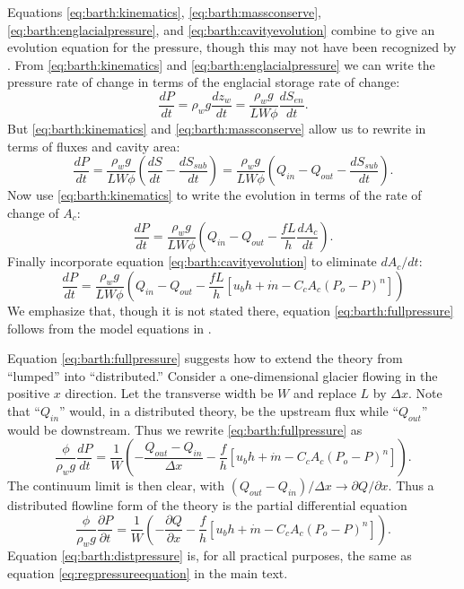 \documentclass[11pt,final]{amsart}
\begin{document}
Equations \eqref{eq:barth:kinematics}, \eqref{eq:barth:massconserve}, \eqref{eq:barth:englacialpressure}, and \eqref{eq:barth:cavityevolution} combine to give an evolution equation for the pressure, though this may not have been recognized by \cite{Bartholomausetal2011}.  From \eqref{eq:barth:kinematics} and \eqref{eq:barth:englacialpressure} we can write the pressure rate of change in terms of the englacial storage rate of change:
	$$\frac{dP}{dt} = \rho_w g \frac{dz_w}{dt} = \frac{\rho_w g}{L W \phi} \frac{d S_{en}}{dt}.$$
But \eqref{eq:barth:kinematics} and \eqref{eq:barth:massconserve}  allow us to rewrite in terms of fluxes and cavity area:
    $$\frac{dP}{dt} = \frac{\rho_w g}{L W \phi} \left(\frac{d S}{dt} - \frac{d S_{sub}}{dt}\right) = \frac{\rho_w g}{L W \phi} \left(Q_{in} - Q_{out} - \frac{d S_{sub}}{dt}\right).$$
Now use \eqref{eq:barth:kinematics} to write the evolution in terms of the rate of change of $A_c$:
    $$\frac{dP}{dt} = \frac{\rho_w g}{L W \phi} \left(Q_{in} - Q_{out} - \frac{f L }{h} \frac{d A_c}{dt}\right).$$
Finally incorporate equation \eqref{eq:barth:cavityevolution} to eliminate $dA_c/dt$:
\begin{equation}
\frac{dP}{dt} = \frac{\rho_w g}{L W \phi} \left(Q_{in} - Q_{out} - \frac{f L }{h} \left[u_b h + \dot m - C_c A_c (P_o-P)^n\right]\right)  \label{eq:barth:fullpressure}
\end{equation}
We emphasize that, though it is not stated there, equation \eqref{eq:barth:fullpressure} follows from the model equations in \cite{Bartholomausetal2011}.

Equation \eqref{eq:barth:fullpressure} suggests how to extend the \cite{Bartholomausetal2011} theory from ``lumped'' into ``distributed.''  Consider a one-dimensional glacier flowing in the positive $x$ direction.  Let the transverse width be $W$ and replace $L$ by $\Delta x$.  Note that ``$Q_{in}$'' would, in a distributed theory, be the upstream flux while ``$Q_{out}$'' would be downstream.  Thus we rewrite \eqref{eq:barth:fullpressure} as
\begin{equation*}
\frac{\phi}{\rho_w g}\frac{dP}{dt} = \frac{1}{W} \left(- \frac{Q_{out} - Q_{in}}{\Delta x} - \frac{f}{h} \left[u_b h + \dot m - C_c A_c (P_o-P)^n\right]\right).
\end{equation*}
The continuum limit is then clear, with $(Q_{out} - Q_{in})/\Delta x \to \partial Q/\partial x$.  Thus a distributed flowline form of the \cite{Bartholomausetal2011} theory is the partial differential equation
\begin{equation}
\frac{\phi}{\rho_w g} \frac{\partial P}{\partial t} = \frac{1}{W} \left(- \frac{\partial Q}{\partial x} - \frac{f}{h} \left[u_b h + \dot m - C_c A_c (P_o-P)^n\right]\right).  \label{eq:barth:distpressure}
\end{equation}
Equation \eqref{eq:barth:distpressure} is, for all practical purposes, the same as equation \eqref{eq:regpressureequation} in the main text.
\end{document}
